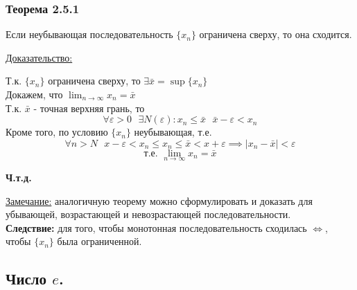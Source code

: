 \documentclass[12pt]{article}
\begin{document}
    \subsubsection*{Теорема 2.5.1}\label{th:2.5.1}
    Если неубывающая последовательность $\{x_n\}$ ограничена сверху, то она сходится.\par\noindent
    \underline{Доказательство:}
    \begin{adjustwidth}{1.5em}{1.5em}
        Т.к. $\{x_n\}$ ограничена сверху, то $\exists \bar{x} = \sup \{x_n\}$\\
        Докажем, что $\lim_{n\to\infty}x_n = \bar{x}$\\
        Т.к. $\bar{x}$ - точная верхняя грань, то 
        \[
            \forall \varepsilon > 0 \text{ } \exists N(\varepsilon) : x_n \le \bar{x}\,\,\,\, \bar{x} - \varepsilon < x_n
        \]
        Кроме того, по условию $\{x_n\}$ неубывающая, т.е.
        \[
            \forall n > N \text{ } x - \varepsilon < x_n \le x_n \le \bar{x} < x + \varepsilon \implies |x_n-\bar{x}| < \varepsilon
        \]
        \[
            \text{т.е. }\lim_{n\to\infty}x_n = \bar{x}
        \]
        \begin{center}
            \textbf{Ч.т.д.}
        \end{center}
    \end{adjustwidth}
    \underline{Замечание:} аналогичную теорему можно сформулировать и доказать для убывающей, возрастающей и невозрастающей последовательности.\\
    \textbf{Следствие:} для того, чтобы монотонная последовательность сходилась $\Longleftrightarrow$, чтобы $\{x_n\}$ была ограниченной.\\

    \subsection{Число $e$.}
\end{document}
